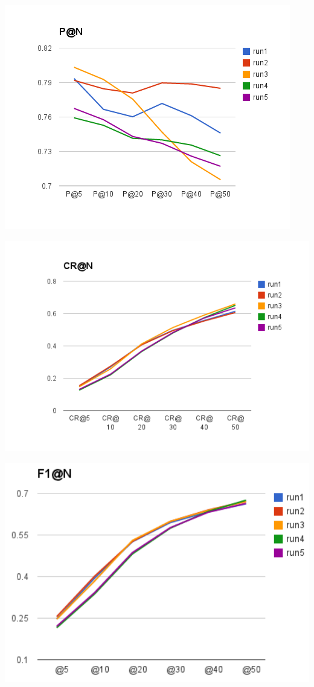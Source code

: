 \documentclass{acm_proc_article-me}
\begin{document}
\includegraphics[width=0.9\linewidth]{p}


\includegraphics[width=0.9\linewidth]{cr}


\includegraphics[width=0.9\linewidth]{f1}
\end{document}
